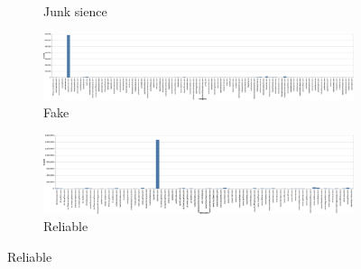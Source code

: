 \begin{figure}[h]
\begin{subfigure}[b]{0.3\textwidth}
         \caption{Junk sience}
     \end{subfigure}
     \vfill
     \begin{subfigure}[b]{1\textwidth}
         \centering
         \includegraphics[width=\textwidth]{chapter/images/data_exploration/fake.eps}
         \caption{Fake}
     \end{subfigure}
     \vfill
     \begin{subfigure}[b]{1\textwidth}
         \centering
         \includegraphics[width=\textwidth]{chapter/images/data_exploration/reliable.eps}
         \caption{Reliable}
     \end{subfigure}
\end{figure}
